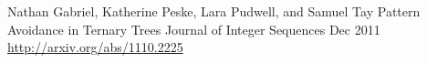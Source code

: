   \begin{cventries}
    \cventry
      {Nathan Gabriel, Katherine Peske, Lara Pudwell, and Samuel Tay}
      {Pattern Avoidance in Ternary Trees}
      {Journal of Integer Sequences}
      {Dec 2011}
      {\href{http://arxiv.org/abs/1110.2225}{http://arxiv.org/abs/1110.2225}}
  \end{cventries}

